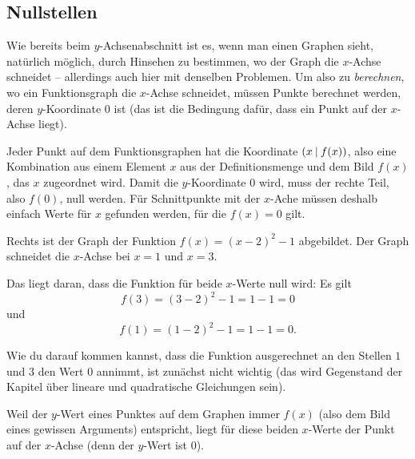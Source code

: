 \documentclass[../../main.tex]{subfiles}
\begin{document}
\fussy

\subsection{Nullstellen}
\label{sec:abbildungen_nullstelle}

Wie bereits beim $y$-Achsenabschnitt ist es, wenn man einen Graphen sieht, natürlich möglich, durch Hinsehen zu bestimmen, wo der Graph die $x$-Achse schneidet -- allerdings auch hier mit denselben Problemen. Um also zu \emph{berechnen}, wo ein Funktionsgraph die $x$-Achse schneidet, müssen Punkte berechnet werden, deren $y$-Koordinate $0$ ist (das ist die Bedingung dafür, dass ein Punkt auf der $x$-Achse liegt).

Jeder Punkt auf dem Funktionsgraphen hat die Koordinate $\left(x \:\middle|\: f(x)\right)$, also eine Kombination aus einem Element $x$ aus der Definitionsmenge und dem Bild $f(x)$, das $x$ zugeordnet wird. Damit die $y$-Koordinate $0$ wird, muss der rechte Teil, also $f(0)$, null werden. Für Schnittpunkte mit der $x$-Ache müssen deshalb einfach Werte für $x$ gefunden werden, für die $f(x)=0$ gilt.

\begin{example}{}
    Rechts ist der Graph der Funktion $f(x)=(x-2)^2-1$ abgebildet. Der Graph schneidet die $x$-Achse bei $x=1$ und $x=3$. 
    
    Das liegt daran, dass die Funktion für beide $x$-Werte null wird: Es gilt \[f(3)=(3-2)^2-1=1-1=0\] und \[f(1)=(1-2)^2-1=1-1=0.\]
    
    Wie du darauf kommen kannst, dass die Funktion ausgerechnet an den Stellen $1$ und $3$ den Wert $0$ annimmt, ist zunächst nicht wichtig (das wird Gegenstand der Kapitel über lineare und quadratische Gleichungen sein).
    
    Weil der $y$-Wert eines Punktes auf dem Graphen immer $f(x)$ (also dem Bild eines gewissen Arguments) entspricht, liegt für diese beiden $x$-Werte der Punkt auf der $x$-Achse (denn der $y$-Wert ist $0$).
\end{example}
\end{document}
